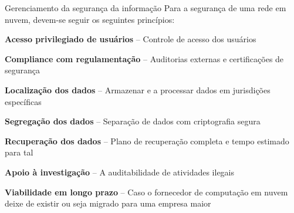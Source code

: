 \begin{frame}{Gerenciamento da segurança da informação}
    Para a segurança de uma rede em nuvem, devem-se seguir os seguintes princípios:
    \begin{itemise}
        \item \textbf{Acesso privilegiado de usuários} -- Controle de acesso dos
            usuários 
        \item \textbf{Compliance com regulamentação} -- Auditorias externas e
            certificações de segurança
        \item \textbf{Localização dos dados} -- Armazenar e a processar dados em
            jurisdições específicas
        \item \textbf{Segregação dos dados} -- Separação de dados com criptografia
            segura 
        \item \textbf{Recuperação dos dados} -- Plano de recuperação completa e
            tempo estimado para tal
        \item \textbf{Apoio à investigação} -- A auditabilidade de atividades
            ilegais 
        \item \textbf{Viabilidade em longo prazo} -- Caso o fornecedor de
            computação em nuvem deixe de existir ou seja migrado para uma empresa maior
    \end{itemise}
\end{frame}
